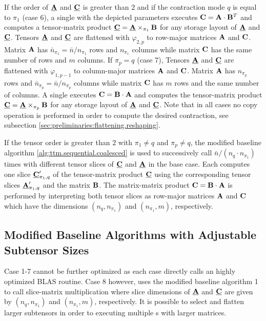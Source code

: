 If the order of $\underline{\mathbf{A}}$ and $\underline{\mathbf{C}}$ is greater than $2$ and if the contraction mode $q$ is equal to $\pi_1$ (case 6), a single  with the depicted parameters executes $\mathbf{C} = \mathbf{A} \cdot \mathbf{B}^T$ and computes a tensor-matrix product $\underline{\mathbf{C}} = \underline{\mathbf{A}} \times_{\pi_1} \mathbf{B}$ for any storage layout of $\underline{\mathbf{A}}$ and $\underline{\mathbf{C}}$.
Tensors $\underline{\mathbf{A}}$ and $\underline{\mathbf{C}}$ are flattened with $\varphi_{2,p}$ to row-major matrices $\mathbf{A}$ and $\mathbf{C}$.
Matrix $\mathbf{A}$ has $\bar{n}_{\pi_1} = \bar{n} / n_{\pi_1}$ rows and $n_{\pi_1}$ columns while matrix $\mathbf{C}$ has the same number of rows and $m$ columns.
If $\pi_p=q$ (case 7), Tensors $\underline{\mathbf{A}}$ and $\underline{\mathbf{C}}$ are flattened with $\varphi_{1,p-1}$ to column-major matrices $\mathbf{A}$ and $\mathbf{C}$.
Matrix $\mathbf{A}$ has $n_{\pi_p}$ rows and $\bar{n}_{\pi_p} =  \bar{n} / n_{\pi_p}$ columns while matrix $\mathbf{C}$ has $m$ rows and the same number of columns.
A single  executes $\mathbf{C} = \mathbf{B} \cdot \mathbf{A}$ and computes the tensor-matrix product $\underline{\mathbf{C}} = \underline{\mathbf{A}} \times_{\pi_p} \mathbf{B}$ for any storage layout of $\underline{\mathbf{A}}$ and $\underline{\mathbf{C}}$.
Note that in all cases no copy operation is performed in order to compute the desired contraction, see subsection \ref{sec:preliminaries:flattening.reshaping}.

If the tensor order is greater than $2$ with $\pi_1\neq q$ and $\pi_p \neq q$, the modified baseline algorithm \ref{alg:ttm.sequential.coalesced} is used to successively call $\bar{n} / (n_q \cdot n_{\pi_1})$ times  with different tensor slices of $\underline{\mathbf{C}}$ and $\underline{\mathbf{A}}$ in the base case.
Each  computes one slice $\underline{\mathbf{C}}_{\pi_1,q}'$ of the tensor-matrix product $\underline{\mathbf{C}}$ using the corresponding tensor slices $\underline{\mathbf{A}}_{\pi_1,q}'$ and the matrix $\mathbf{B}$.
The matrix-matrix product $\mathbf{C} = \mathbf{B} \cdot \mathbf{A}$ is performed by interpreting both tensor slices as row-major matrices $\mathbf{A}$ and $\mathbf{C}$ which have the dimensions $(n_q,n_{\pi_1})$ and $(n_{\pi_1},m)$, respectively.

\subsection{Modified Baseline Algorithms with Adjustable Subtensor Sizes}
\label{sec:design:blas.based.algorithm}
Case 1-7 cannot be further optimized as each case directly calls an highly optimized BLAS routine.
Case 8 however, uses the modified baseline algorithm 1 to call slice-matrix multiplication where slice dimensions of $\underline{\mathbf{A}}$ and $\underline{\mathbf{C}}$ are given by $(n_q,n_{\pi_1})$ and $(n_{\pi_1},m)$, respectively.
It is possible to select and flatten larger subtensors in order to executing multiple s with larger matrices.

